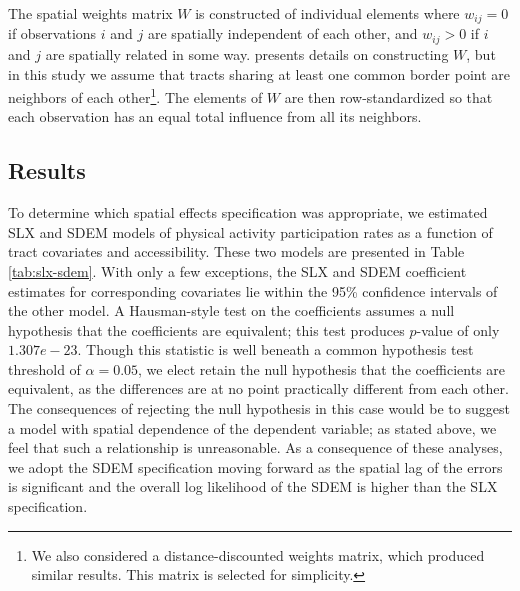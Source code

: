 \documentclass[shortAfour,sageh.bst]{sagej}
\begin{document}
The spatial weights matrix \(W\) is constructed of individual elements
where \(w_{ij} = 0\) if observations \(i\) and \(j\) are spatially
independent of each other, and \(w_{ij} > 0\) if \(i\) and \(j\) are
spatially related in some way. \citet{Dubin1998} presents details on
constructing \(W\), but in this study we assume that tracts sharing at
least one common border point are neighbors of each other\footnote{We
  also considered a distance-discounted weights matrix, which produced
  similar results. This matrix is selected for simplicity.}. The
elements of \(W\) are then row-standardized so that each observation has
an equal total influence from all its neighbors.

\hypertarget{results}{%
\subsection{Results}\label{results}}

To determine which spatial effects specification was appropriate, we
estimated SLX and SDEM models of physical activity participation rates
as a function of tract covariates and accessibility. These two models
are presented in Table \ref{tab:slx-sdem}. With only a few exceptions,
the SLX and SDEM coefficient estimates for corresponding covariates lie
within the 95\% confidence intervals of the other model. A Hausman-style
test \citep{Pace2008} on the coefficients assumes a null hypothesis that
the coefficients are equivalent; this test produces \(p\)-value of only
\(1.307e-23\). Though this statistic is well beneath a common hypothesis
test threshold of \(\alpha = 0.05\), we elect retain the null hypothesis
that the coefficients are equivalent, as the differences are at no point
practically different from each other. The consequences of rejecting the
null hypothesis in this case would be to suggest a model with spatial
dependence of the dependent variable; as stated above, we feel that such
a relationship is unreasonable. As a consequence of these analyses, we
adopt the SDEM specification moving forward as the spatial lag of the
errors is significant and the overall log likelihood of the SDEM is
higher than the SLX specification.
\end{document}
